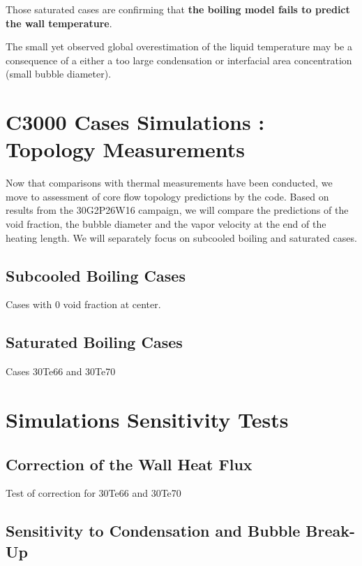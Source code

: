 \npar

Those saturated cases are confirming that \textbf{the boiling model fails to predict the wall temperature}. 


\begin{remark*}{}
The small yet observed global overestimation of the liquid temperature may be a consequence of a either a too large condensation or interfacial area concentration (\ie small bubble diameter). 
\end{remark*}




\section{C3000 Cases Simulations : Topology Measurements}

Now that comparisons with thermal measurements have been conducted, we move to assessment of core flow topology predictions by the code. Based on results from the 30G2P26W16 campaign, we will compare the predictions of the void fraction, the bubble diameter and the vapor velocity at the end of the heating length. We will separately focus on subcooled boiling and saturated cases.


\subsection{Subcooled Boiling Cases}

Cases with 0 void fraction at center.

\subsection{Saturated Boiling Cases}

Cases 30Te66 and 30Te70

\section{Simulations Sensitivity Tests}


\subsection{Correction of the Wall Heat Flux}

Test of correction for 30Te66 and 30Te70


\subsection{Sensitivity to Condensation and Bubble Break-Up}

